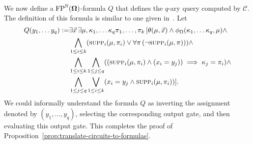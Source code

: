 \documentclass[../main/thesis.tex]{subfiles}
\begin{document}
We now define a $\text{\upshape FP}^{\mathbb{N}}(\mathbf{\mathbf{\Omega}})$-formula $Q$ that defines the $q$-ary query
computed by $\mathcal{C}$. The definition of this formula is similar to one
given in~\cite{AndersonD17}. Let
\begin{align*}
  Q (y_1, \ldots y_q) := & \exists \vec{x} \, \exists \mu, \kappa_1 , \ldots  \kappa_q \pi_1 , \ldots , \pi_k \, [\theta (\mu, \vec{x}) \land \phi_\Omega (\kappa_1, \ldots \kappa_q, \mu) \land \\
                         & \bigwedge_{1 \leq i \leq k} (\textsc{supp}_i (\mu, \pi_i) \lor \forall \pi \, (\neg \textsc{supp}_i (\mu, \pi))) \land \\
                         & \bigwedge_{1 \leq i \leq k} \bigwedge_{1 \leq j \leq q}((\textsc{supp}_i (\mu, \pi_i) \land (x_i = y_j)) \implies \kappa_j = \pi_i) \land \\ &                                                                                                                                                        \bigwedge_{1 \leq j \leq q} \bigvee_{1 \leq i \leq k} (x_i = y_j \land \textsc{supp}_i (\mu, \pi_i))].
\end{align*}
We could informally understand the formula $Q$ as inverting the assignment
denoted by $(y_1, \ldots, y_q)$, selecting the corresponding output gate, and
then evaluating this output gate. This completes the proof of
Proposition~\ref{prop:translate-circuits-to-formulas}.
\end{document}
